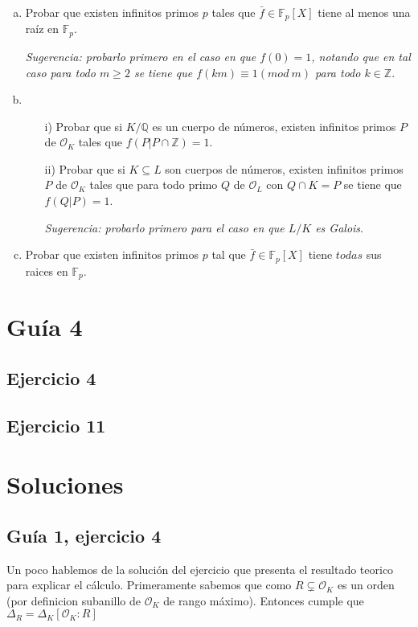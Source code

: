 \documentclass[12pt]{amsart}
\newcommand{\QQ}{\mathbb{Q}}
\newcommand{\ZZ}{\mathbb{Z}}
\newcommand{\FF}{\mathbb{F}}
\newcommand{\OO}{\mathcal{O}}
\theoremstyle{plain}
\begin{document}
\begin{enumerate}[a)]
    \item Probar que existen infinitos primos $p$ tales que $\bar{f}\in
    \FF_p[X]$ tiene al menos una raíz en $\FF_p$.

    \textit{Sugerencia: probarlo primero en el caso en que $f(0) = 1$, 
    notando que en tal caso para todo $m \geq 2$ se tiene que 
    $f(km)\equiv 1 (mod\ m)$ para todo $k\in \ZZ$}.
    
    \item \begin{enumerate}
        \item[\textup{i)}] Probar que si $K/\QQ$ es un cuerpo de números, existen 
        infinitos primos $P$ de $\OO_K$ tales que $f(P|P\cap\ZZ)=1$.

        \item[\textup{ii)}] Probar que si $K\subseteq L$ son cuerpos de números, 
        existen infinitos primos $P$ de $\OO_K$ tales que para todo 
        primo $Q$ de $\OO_L$ con $Q\cap K = P$ se tiene que $f(Q|P)=1$.

        \textit{Sugerencia: probarlo primero para el caso en que $L/K$
        es Galois}.
    \end{enumerate}
    
    \item Probar que existen infinitos primos $p$ tal que $\bar{f}\in
    \FF_p[X]$ tiene $todas$ sus raices en $\FF_p$.
\end{enumerate}

\section*{Guía 4}

\subsection*{Ejercicio 4} 

\subsection*{Ejercicio 11} 

\newpage

\section*{Soluciones}

\subsection*{Guía 1, ejercicio 4}
Un poco hablemos de la solución del ejercicio que presenta el resultado
teorico para explicar el cálculo. Primeramente sabemos que como 
$R \subsetneq \OO_K$ es un orden (por definicion subanillo de $\OO_K$
de rango máximo). Entonces cumple que $\Delta_R = \Delta_K [\OO_K:R]$
\end{document}
